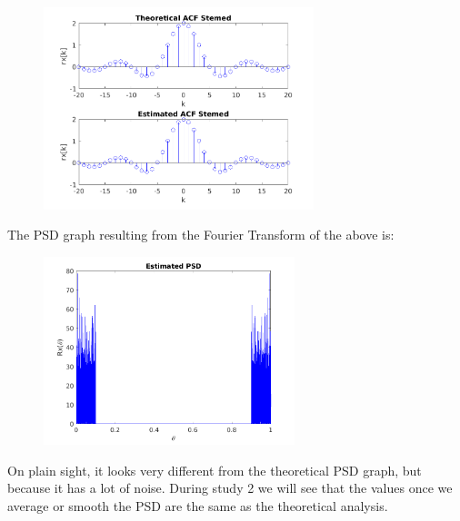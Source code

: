 \documentclass[a4paper,11pt]{article}
\begin{document}
\begin{figure}[!hp]
    \begin{center}
      \includegraphics[width=0.7\textwidth]{images/study1/comp_r_hd_stem.png}
    \end{center}
\end{figure}

\newpage

The PSD graph resulting from the Fourier Transform of the above is:

\begin{figure}[!hp]
    \begin{center}
      \includegraphics[width=0.65\textwidth]{images/study1/R_hd_es.png}
    \end{center}
\end{figure}

On plain sight, it looks very different from the theoretical PSD graph, but
because it has a lot of noise. During study 2 we will see that the values once
we average or smooth the PSD are the same as the theoretical analysis.
\end{document}
